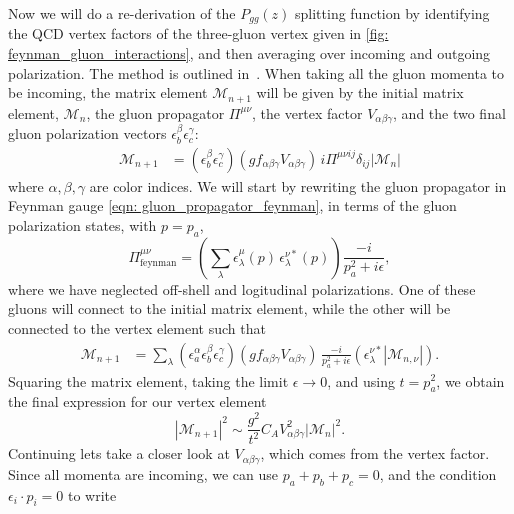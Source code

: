 \documentclass[main.tex]{subfiles}
\begin{document}
Now we will do a re-derivation of the \(P_{gg}(z)\) splitting function by identifying the QCD vertex factors of the three-gluon vertex given in \autoref{fig: feynman_gluon_interactions}, and then averaging over incoming and outgoing polarization. The method is outlined in~\cite[p.159-163]{ellis_stirling_webber_1996}. When taking all the gluon momenta to be incoming, the matrix element \(\mathcal{M}_{n+1}\) will be given by the initial matrix element, \(\mathcal{M}_n\), the gluon propagator \(\Pi^{\mu\nu}\), the vertex factor \(V_{\alpha\beta\gamma}\), and the two final gluon polarization vectors \(\epsilon_b^\beta\epsilon_c^\gamma\):
\begin{align}
    \mathcal{M}_{n+1} &=  \left( \epsilon_b^\beta \epsilon_c^\gamma  \right) \left(gf_{\alpha\beta\gamma} V_{\alpha\beta\gamma}\right)  \, i \Pi^{\mu\nu ij}\delta_{ij}  |\mathcal{M}_n|
\end{align}
where \(\alpha,\beta,\gamma\) are color indices. We will start by rewriting the gluon propagator in Feynman gauge \autoref{eqn: gluon_propagator_feynman}, in terms of the gluon polarization states, with \(p = p_a\),
\begin{equation}
    \Pi_{\text{feynman}}^{\mu\nu} = \left(\sum_\lambda \epsilon_\lambda^\mu(p)\, \epsilon_\lambda^{\nu*}(p) \right) \frac{-i}{p_a^2+i\epsilon},
\end{equation}
where we have neglected off-shell and logitudinal polarizations. One of these gluons will connect to the initial matrix element, while the other will be connected to the vertex element such that
\begin{align}
    \mathcal{M}_{n+1} &=  \sum_\lambda \left(\epsilon_a^\alpha \epsilon_b^\beta \epsilon_c^\gamma  \right) \left(gf_{\alpha\beta\gamma} V_{\alpha\beta\gamma}\right) \, \frac{-i}{p_a^2+i\epsilon} \left(\epsilon_\lambda^{\nu*} |\mathcal{M}_{n,\nu}|\right).
\end{align}
Squaring the matrix element, taking the limit \(\epsilon \rightarrow 0\), and using \(t=p_a^2\), we obtain the final expression for our vertex element
\begin{equation}\label{eqn: ggg_matrix_element}
    |\mathcal{M}_{n+1}|^2 \sim \frac{g^2}{t^2} C_A V_{\alpha\beta\gamma}^2  |\mathcal{M}_n|^2.
\end{equation}
Continuing lets take a closer look at \(V_{\alpha\beta\gamma}\), which comes from the vertex factor. Since all momenta are incoming, we can use \(p_a +p_b +p_c = 0\), and the condition \(\epsilon_i \cdot p_i = 0\) to write
\end{document}
